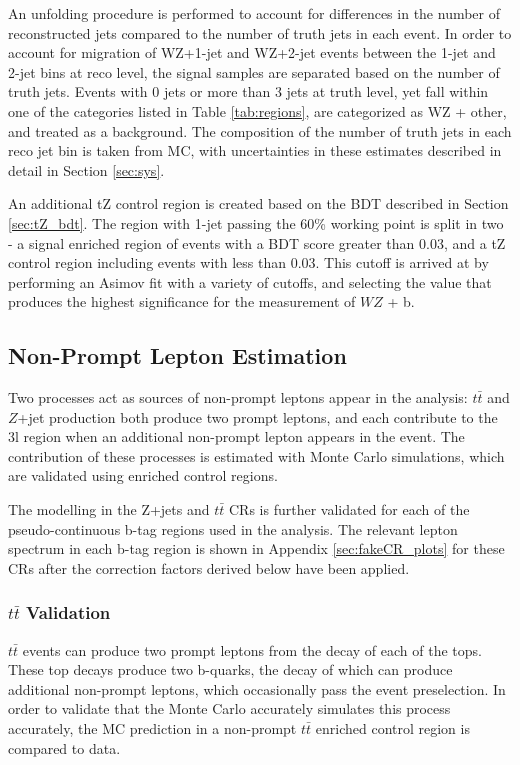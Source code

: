 An unfolding procedure is performed to account for differences in the number of reconstructed jets compared to the number of truth jets in each event. In order to account for migration of WZ+1-jet and WZ+2-jet events between the 1-jet and 2-jet bins at reco level, the signal samples are separated based on the number of truth jets. Events with 0 jets or more than 3 jets at truth level, yet fall within one of the categories listed in Table \ref{tab:regions}, are categorized as WZ + other, and treated as a background. The composition of the number of truth jets in each reco jet bin is taken from MC, with uncertainties in these estimates described in detail in Section \ref{sec:sys}. 

An additional tZ control region is created based on the BDT described in Section \ref{sec:tZ_bdt}. The region with 1-jet passing the 60\% working point is split in two - a signal enriched region of events with a BDT score greater than 0.03, and a tZ control region including events with less than 0.03. This cutoff is arrived at by performing an Asimov fit with a variety of cutoffs, and selecting the value that produces the highest significance for the measurement of $WZ$ + b.

\subsection{Non-Prompt Lepton Estimation}
\label{sec:fakes}

Two processes act as sources of non-prompt leptons appear in the analysis: $t\bar{t}$ and $Z$+jet production both produce two prompt leptons, and each contribute to the 3l region when an additional non-prompt lepton appears in the event. The contribution of these processes is estimated with Monte Carlo simulations, which are validated using enriched control regions.

The modelling in the Z+jets and $t\bar{t}$ CRs is further validated for each of the pseudo-continuous b-tag regions used in the analysis. The relevant lepton \pt spectrum in each b-tag region is shown in Appendix \ref{sec:fakeCR_plots} for these CRs  after the correction factors derived below have been applied.

\subsubsection{$t\bar{t}$ Validation}

$t\bar{t}$ events can produce two prompt leptons from the decay of each of the tops. These top decays produce two b-quarks, the decay of which can produce additional non-prompt leptons, which occasionally pass the event preselection. In order to validate that the Monte Carlo accurately simulates this process accurately, the MC prediction in a non-prompt $t\bar{t}$ enriched control region is compared to data.

